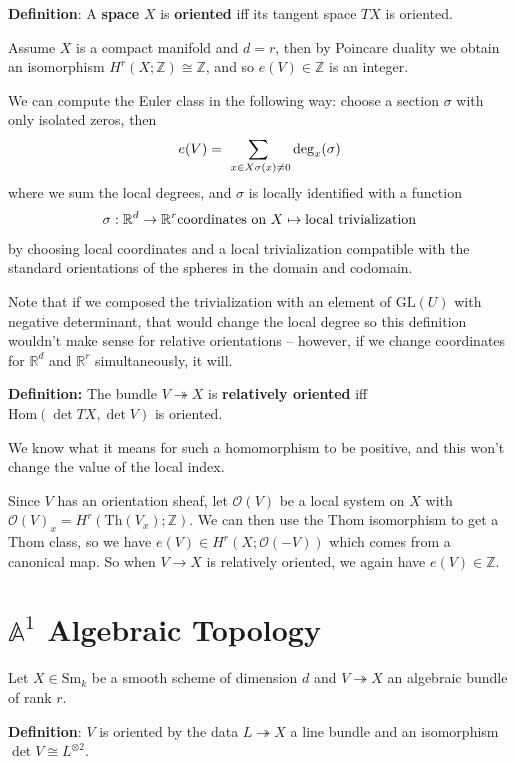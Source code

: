 \documentclass[11pt]{scrreprt}
\theoremstyle{definition}
\newcommand{\RR}[0]{{\mathbb{R}}}
\newcommand{\ZZ}[0]{{\mathbb{Z}}}
\newcommand{\Af}[0]{{\mathbb{A}}}
\newcommand{\GL}[0]{{\text{GL}}}
\newcommand{\tensor}[0]{\otimes}
\newcommand{\Sm}[0]{{\text{Sm}_k}}
\newcommand{\surjects}[0]{\twoheadrightarrow}
\renewcommand{\hom}[0]{\text{Hom}}
\begin{document}
\textbf{Definition}: A \textbf{space} \(X\) is \textbf{oriented} iff its
tangent space \(TX\) is oriented.

Assume \(X\) is a compact manifold and \(d=r\), then by Poincare duality
we obtain an isomorphism \(H^r(X; \ZZ) \cong \ZZ\), and so
\(e(V)\in \ZZ\) is an integer.

We can compute the Euler class in the following way: choose a section
\(\sigma\) with only isolated zeros, then \[
e(V) = \sum_{~~x\in X\\ \sigma(x) \neq 0} \deg_x(\sigma)
\] where we sum the local degrees, and \(\sigma\) is locally identified
with a function \[
\sigma: \RR^d \to \RR^r \\
\text{coordinates on } X \mapsto \text{local trivialization}
\] by choosing local coordinates and a local trivialization compatible
with the standard orientations of the spheres in the domain and
codomain.

Note that if we composed the trivialization with an element of
\(\GL(U)\) with negative determinant, that would change the local degree
so this definition wouldn't make sense for relative orientations --
however, if we change coordinates for \(\RR^d\) and \(\RR^r\)
simultaneously, it will.

\textbf{Definition:} The bundle \(V\surjects X\) is \textbf{relatively
oriented} iff \(\hom(\det TX, \det V)\) is oriented.

We know what it means for such a homomorphism to be positive, and this
won't change the value of the local index.

Since \(V\) has an orientation sheaf, let \(\mathcal O(V)\) be a local
system on \(X\) with \(\mathcal O(V)_x = H^r(\text{Th}(V_x); \ZZ)\). We
can then use the Thom isomorphism to get a Thom class, so we have
\(e(V) \in H^r(X; \mathcal O(-V))\) which comes from a canonical map. So
when \(V\to X\) is relatively oriented, we again have \(e(V) \in \ZZ\).

\hypertarget{af1-algebraic-topology}{%
\section{\texorpdfstring{\(\Af^1\) Algebraic
Topology}{\textbackslash{}Af\^{}1 Algebraic Topology}}\label{af1-algebraic-topology}}

Let \(X\in\Sm\) be a smooth scheme of dimension \(d\) and
\(V\surjects X\) an algebraic bundle of rank \(r\).

\textbf{Definition}: \(V\) is oriented by the data \(L\surjects X\) a
line bundle and an isomorphism \(\det V \cong L^{\tensor 2}\).
\end{document}
